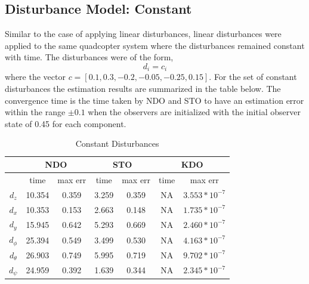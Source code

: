 \documentclass[letterpaper%
, twoside%
, 12pt%
,memoire%
, english%
,creativecommons,hyperref%
]{thETS}
\begin{document}
\subsection{Disturbance Model: Constant}
Similar to the case of applying linear disturbances, linear disturbances were applied to the same quadcopter system where the disturbances remained constant with time. The disturbances were of the form, 
\begin{equation}
d_i = c_i
\label{eq:dist_4}
\end{equation}
where the vector $c=[0.1,0.3,-0.2,-0.05,-0.25,0.15]$. 
For the set of constant disturbances the estimation results are summarized in the table below. The convergence time is the time taken by NDO and STO to have an estimation error within the range $\pm0.1$ when the observers are initialized with the initial observer state of 0.45 for each component.
\begin{table}[!htbp]
\centering
\caption{Constant Disturbances}
\begin{tabular}{|c|c|c|c|c|c|c|}
\hline
{}  &  \multicolumn{2}{c|}{NDO} & \multicolumn{2}{c|}{STO} & \multicolumn{2}{c|}{KDO}\\
\hline
{}        &   time   & max err  & time  & max err& time  & max err\\
$d_z$     &  10.354 & 0.359   & 3.259  & 0.359 & NA     & $3.553*10^{-7}$\\
$d_x$     &  10.353 & 0.153   & 2.663  & 0.148 & NA     & $1.735*10^{-7}$\\
$d_y$     &  15.945 & 0.642   & 5.293  & 0.669 & NA     & $2.460*10^{-7}$\\
$d_\phi$  &  25.394 & 0.549   & 3.499  & 0.530 & NA     & $4.163*10^{-7}$\\
$d_\theta$&  26.903 & 0.749   & 5.995  & 0.719 & NA     & $9.702*10^{-7}$\\
$d_\psi$  &  24.959 & 0.392   & 1.639  & 0.344 & NA     & $2.345*10^{-7}$\\
\hline
\end{tabular}
\end{table}
\end{document}
